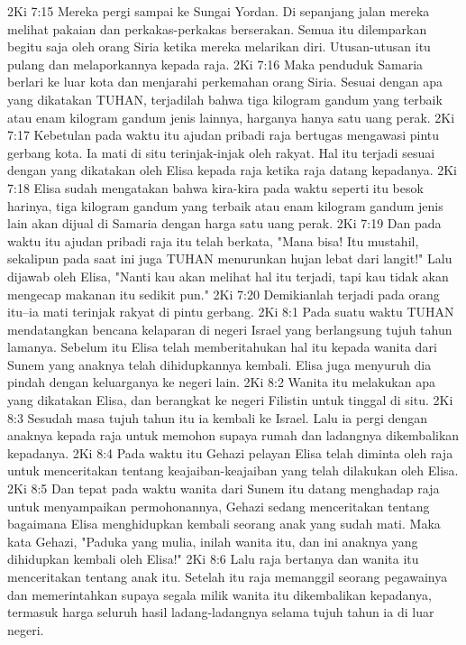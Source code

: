 2Ki 7:15  Mereka pergi sampai ke Sungai Yordan. Di sepanjang jalan mereka melihat pakaian dan perkakas-perkakas berserakan. Semua itu dilemparkan begitu saja oleh orang Siria ketika mereka melarikan diri. Utusan-utusan itu pulang dan melaporkannya kepada raja.
2Ki 7:16  Maka penduduk Samaria berlari ke luar kota dan menjarahi perkemahan orang Siria. Sesuai dengan apa yang dikatakan TUHAN, terjadilah bahwa tiga kilogram gandum yang terbaik atau enam kilogram gandum jenis lainnya, harganya hanya satu uang perak.
2Ki 7:17  Kebetulan pada waktu itu ajudan pribadi raja bertugas mengawasi pintu gerbang kota. Ia mati di situ terinjak-injak oleh rakyat. Hal itu terjadi sesuai dengan yang dikatakan oleh Elisa kepada raja ketika raja datang kepadanya.
2Ki 7:18  Elisa sudah mengatakan bahwa kira-kira pada waktu seperti itu besok harinya, tiga kilogram gandum yang terbaik atau enam kilogram gandum jenis lain akan dijual di Samaria dengan harga satu uang perak.
2Ki 7:19  Dan pada waktu itu ajudan pribadi raja itu telah berkata, "Mana bisa! Itu mustahil, sekalipun pada saat ini juga TUHAN menurunkan hujan lebat dari langit!" Lalu dijawab oleh Elisa, "Nanti kau akan melihat hal itu terjadi, tapi kau tidak akan mengecap makanan itu sedikit pun."
2Ki 7:20  Demikianlah terjadi pada orang itu--ia mati terinjak rakyat di pintu gerbang.
2Ki 8:1  Pada suatu waktu TUHAN mendatangkan bencana kelaparan di negeri Israel yang berlangsung tujuh tahun lamanya. Sebelum itu Elisa telah memberitahukan hal itu kepada wanita dari Sunem yang anaknya telah dihidupkannya kembali. Elisa juga menyuruh dia pindah dengan keluarganya ke negeri lain.
2Ki 8:2  Wanita itu melakukan apa yang dikatakan Elisa, dan berangkat ke negeri Filistin untuk tinggal di situ.
2Ki 8:3  Sesudah masa tujuh tahun itu ia kembali ke Israel. Lalu ia pergi dengan anaknya kepada raja untuk memohon supaya rumah dan ladangnya dikembalikan kepadanya.
2Ki 8:4  Pada waktu itu Gehazi pelayan Elisa telah diminta oleh raja untuk menceritakan tentang keajaiban-keajaiban yang telah dilakukan oleh Elisa.
2Ki 8:5  Dan tepat pada waktu wanita dari Sunem itu datang menghadap raja untuk menyampaikan permohonannya, Gehazi sedang menceritakan tentang bagaimana Elisa menghidupkan kembali seorang anak yang sudah mati. Maka kata Gehazi, "Paduka yang mulia, inilah wanita itu, dan ini anaknya yang dihidupkan kembali oleh Elisa!"
2Ki 8:6  Lalu raja bertanya dan wanita itu menceritakan tentang anak itu. Setelah itu raja memanggil seorang pegawainya dan memerintahkan supaya segala milik wanita itu dikembalikan kepadanya, termasuk harga seluruh hasil ladang-ladangnya selama tujuh tahun ia di luar negeri.
